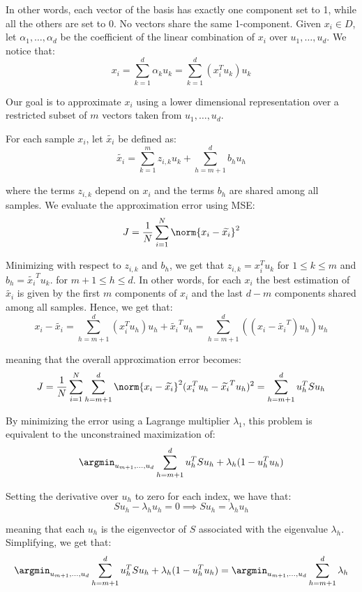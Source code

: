 \documentclass[a4paper, 12pt]{report}
\begin{document}
    In other words, each vector of the basis has exactly one component set to 1, while all the others are set to 0. No vectors share the same 1-component. Given $x_i \in D$, let $\alpha_1, \ldots, \alpha_d$ be the coefficient of the linear combination of $x_i$ over $u_1, \ldots, u_d$. We notice that:
    \[x_i = \sum_{k = 1}^d \alpha_k u_k = \sum_{k = 1}^d (x_i^T u_k) u_k\]

    Our goal is to approximate $x_i$ using a lower dimensional representation over a restricted subset of $m$ vectors taken from $u_1, \ldots, u_d$.

    For each sample $x_i$, let $\widetilde{x_i}$ be defined as:
    \[\widetilde{x_i} = \sum_{k = 1}^m z_{i,k} u_k + \sum_{h = m+1}^d b_h u_h\]

    where the terms $z_{i,k}$ depend on $x_i$ and the terms $b_h$ are shared among all samples. We evaluate the approximation error using MSE:
    \[J = \frac{1}{N} \sum_{i = 1}^N \norm{x_i - \widetilde{x_i}}^2\]

    Minimizing with respect to $z_{i,k}$ and $b_h$, we get that $z_{i,k} = x_i^T u_k$ for $1 \leq k \leq m$ and $b_h = \widetilde{x_i}^T u_k$. for $m+1 \leq h \leq d$. In other words, for each $x_i$ the best estimation of $\widetilde{x_i}$ is given by the first $m$ components of $x_i$ and the last $d-m$ components shared among all samples. Hence, we get that:
    \[x_i - \widetilde{x_i} = \sum_{h = m+1}^d (x_i^T u_h) u_h + \widetilde{x_i}^T u_h = \sum_{h = m+1}^d ((x_i - \widetilde{x_i}^T)u_h)u_h\]

    meaning that the overall approximation error becomes:
    \[J = \frac{1}{N} \sum_{i = 1}^N  \sum_{h = m+1}^d \norm{x_i - \widetilde{x_i}}^2 (x_i^T u_h - \widetilde{x_i}^T u_h)^2 = \sum_{h = m+1}^d u_h^T S u_h\]

    By minimizing the error using a Lagrange multiplier $\lambda_1$, this problem is equivalent to the unconstrained maximization of:
    \[\argmin_{u_{m+1}, \ldots, u_d} \sum_{h = m+1}^d u_h^T S u_h + \lambda_h(1-u_h^T u_h)\]

    Setting the derivative over $u_h$ to zero for each index, we have that:
    \[S u_h - \lambda_h u_h = 0 \implies S u_h = \lambda_h u_h\]

    meaning that each $u_h$ is the eigenvector of $S$ associated with the eigenvalue $\lambda_h$. Simplifying, we get that:
    \[\argmin_{u_{m+1}, \ldots, u_d} \sum_{h = m+1}^d u_h^T S u_h + \lambda_h(1-u_h^T u_h) = \argmin_{u_{m+1}, \ldots, u_d} \sum_{h = m+1}^d \lambda_h\]
     
\end{document}
